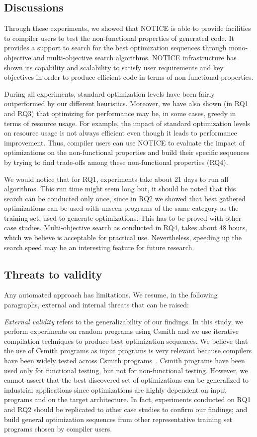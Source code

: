 \subsection{Discussions}
Through these experiments, we showed that NOTICE is able to provide facilities to compiler users to test the non-functional properties of generated code. 
It provides a support to search for the best optimization sequences through mono-objective and multi-objective search algorithms. NOTICE infrastructure has shown its capability and scalability to satisfy user requirements and key objectives in order to produce efficient code in terms of non-functional properties. 

During all experiments, standard optimization levels have been fairly outperformed by our different heuristics. 
Moreover, we have also shown (in RQ1 and RQ3) that optimizing for performance may be, in some cases, greedy in terms of resource usage. For example, the impact of standard optimization levels on resource usage is not always efficient even though it leads to performance improvement. 
Thus, compiler users can use NOTICE to evaluate the impact of optimizations on the non-functional properties and build their specific sequences by trying to find trade-offs among these non-functional properties (RQ4). 

We would notice that for RQ1, experiments take about 21 days to run all algorithms. This run time might seem long but, it should be noted that this search can be conducted only once, since in RQ2 we showed that best gathered optimizations can be used with unseen programs of the same category as the training set, used to generate optimizations. This has to be proved with other case studies. 
Multi-objective search as conducted in RQ4, takes about 48 hours, which we believe is acceptable for practical use. Nevertheless, speeding up the search speed may be an interesting feature for future research.
		
\subsection{Threats to validity}
Any automated approach has limitations. We resume, in the following paragraphs, external and internal threats that can be raised:
		
\textit{External validity} refers to the generalizability of our findings. In this study, we perform experiments on random programs using Csmith and we use iterative compilation techniques to produce best optimization sequences. We believe that the use of Csmith programs as input programs is very relevant because compilers have been widely tested across Csmith programs~\cite{chen2016empirical,yang2011finding}. Csmith programs have been used only for functional testing, but not for non-functional testing. However, we cannot assert that the best discovered set of optimizations can be generalized to industrial applications since optimizations are highly dependent on input programs and on the target architecture. In fact, experiments conducted on RQ1 and RQ2 should be replicated to other case studies to confirm our findings; and build general optimization sequences from other representative training set programs chosen by compiler users.
		
